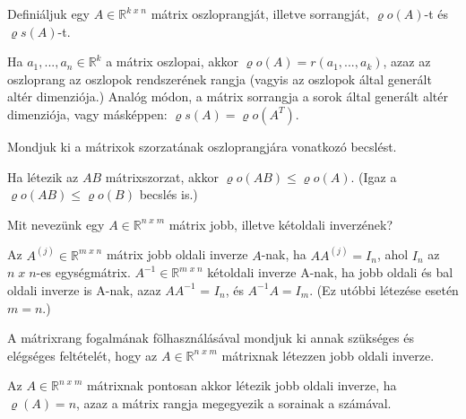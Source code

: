 \begin{frame}
  \begin{tcolorbox}[title={14}]
    Definiáljuk egy $A \in \mathbb{R}^{k \; x \; n}$ mátrix oszloprangját, illetve sorrangját, ${\varrho}o(A)$-t és ${\varrho}s(A)$-t.

  \tcblower
Ha $a_1,...,a_n \in \mathbb{R}^k$ a mátrix oszlopai, akkor ${\varrho}o(A) = r(a_1,...,a_k)$, azaz az oszloprang az oszlopok rendszerének rangja (vagyis az oszlopok által generált altér dimenziója.) Analóg módon, a mátrix sorrangja a sorok által generált altér dimenziója, vagy másképpen: ${\varrho}s(A) = {\varrho}o(A^T)$.

  \end{tcolorbox}
\end{frame}

\begin{frame}
  \begin{tcolorbox}[title={15}]
   Mondjuk ki a mátrixok szorzatának oszloprangjára vonatkozó becslést.


  \tcblower
Ha létezik az $AB$ mátrixszorzat, akkor ${\varrho}o(AB) \leq {\varrho}o(A)$. (Igaz a ${\varrho}o(AB) \leq {\varrho}o(B)$ becslés is.)

  \end{tcolorbox}
\end{frame}


\begin{frame}
  \begin{tcolorbox}[title={16}]
     Mit nevezünk egy $A \in \mathbb{R}^{n \; x \; m}$ mátrix jobb, illetve kétoldali inverzének?

  \tcblower
Az $A^{(j)} \in \mathbb{R}^{m \; x \; n}$ mátrix jobb oldali inverze $A$-nak, ha $AA^{(j)} = I_n$, ahol $I_n$ az $n \; x \; n$-es egységmátrix. $A^{-1} \in \mathbb{R}^{m \; x \; n}$ kétoldali inverze A-nak, ha jobb oldali és bal oldali inverze is A-nak, azaz $AA^{-1}$ = $I_n$, és $A^{-1}A = I_m$. (Ez utóbbi létezése esetén $m = n$.)

  \end{tcolorbox}
\end{frame}


\begin{frame}
  \begin{tcolorbox}[title={17}]
    A mátrixrang fogalmának fölhasználásával mondjuk ki annak szükséges és elégséges feltételét, hogy az $A \in \mathbb{R}^{n \; x \; m}$ mátrixnak létezzen jobb oldali inverze.

  \tcblower
Az $A \in \mathbb{R}^{n \; x \; m}$ mátrixnak pontosan akkor létezik jobb oldali inverze, ha ${\varrho}(A) = n$, azaz a mátrix rangja megegyezik a sorainak a számával.

  \end{tcolorbox}
\end{frame}


